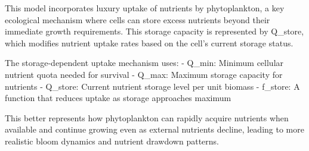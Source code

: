 This model incorporates luxury uptake of nutrients by phytoplankton, a key ecological mechanism where cells can store excess nutrients beyond their immediate growth requirements. This storage capacity is represented by Q_store, which modifies nutrient uptake rates based on the cell's current storage status.

The storage-dependent uptake mechanism uses:
- Q_min: Minimum cellular nutrient quota needed for survival
- Q_max: Maximum storage capacity for nutrients
- Q_store: Current nutrient storage level per unit biomass
- f_store: A function that reduces uptake as storage approaches maximum

This better represents how phytoplankton can rapidly acquire nutrients when available and continue growing even as external nutrients decline, leading to more realistic bloom dynamics and nutrient drawdown patterns.
